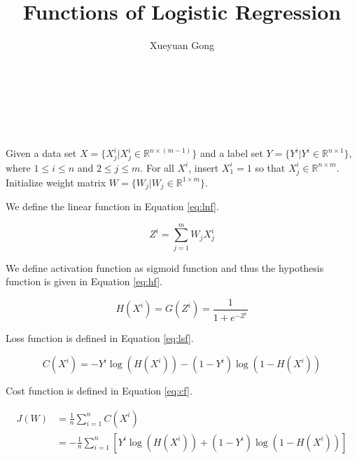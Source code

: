 \documentclass{sig-alternate}
\begin{document}
\title{Functions of Logistic Regression}

\author{
	\alignauthor
	Xueyuan Gong\\
	\\
	\\
    \\
    \\
}

\maketitle

Given a data set $X=\{X^{i}_{j}|X^{i}_{j}\in \mathbb{R}^{n\times (m-1)}\}$ and a label set $Y=\{Y^{i}|Y^{i}\in \mathbb{R}^{n\times 1}\}$, where $1\leq i\leq n$ and $2\leq j \leq m$. For all $X^{i}$, insert $X^{i}_{1}=1$ so that $X^{i}_{j}\in \mathbb{R}^{n\times m}$. Initialize weight matrix $W=\{W_{j}|W_{j}\in \mathbb{R}^{1\times m}\}$.

We define the linear function in Equation \eqref{eq:lnf}.

\begin{equation}
\label{eq:lnf}
	Z^{i}=\sum_{j=1}^{m}W_{j}X^{i}_{j}
\end{equation}

We define activation function as sigmoid function and thus the hypothesis function is given in Equation \eqref{eq:hf}.

\begin{equation}
\label{eq:hf}
	H(X^{i}) = G(Z^{i})=\frac{1}{1+e^{-Z^{i}}}
\end{equation}

Loss function is defined in Equation \eqref{eq:lsf}.

\begin{equation}
\label{eq:lsf}
	C(X^{i})=-Y^{i}\log{(H(X^{i}))}-(1-Y^{i})\log{(1-H(X^{i}))}
\end{equation}

Cost function is defined in Equation \eqref{eq:cf}.

\begin{equation}
\label{eq:cf}
	\begin{aligned}
	J(W)&=\frac{1}{n}\sum_{i=1}^{n}C(X^{i})\\
		&=-\frac{1}{n}\sum_{i=1}^{n}[Y^{i}\log{(H(X^{i}))}+(1-Y^{i})\log{(1-H(X^{i}))}]
	\end{aligned}
\end{equation}
\end{document}
